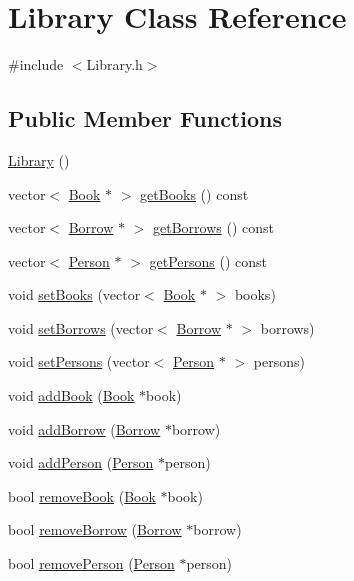 \hypertarget{class_library}{\section{Library Class Reference}
\label{class_library}
}


{\ttfamily \#include $<$Library.\+h$>$}

\subsection*{Public Member Functions}
\begin{DoxyCompactItemize}
\item 
\hyperlink{class_library_a82338219d8bf51962ff5f60a0db21b19}{Library} ()
\item 
vector$<$ \hyperlink{class_book}{Book} $\ast$ $>$ \hyperlink{class_library_a5c68dd0db0e426e601d56026dcab0c3a}{get\+Books} () const 
\item 
vector$<$ \hyperlink{class_borrow}{Borrow} $\ast$ $>$ \hyperlink{class_library_a426200a81b0a586d77d06f950d9f90c5}{get\+Borrows} () const 
\item 
vector$<$ \hyperlink{class_person}{Person} $\ast$ $>$ \hyperlink{class_library_afc03e416a30d319118794634f4be2e53}{get\+Persons} () const 
\item 
void \hyperlink{class_library_a4e0ca35d3bdeff3f8d173b4e721d37a8}{set\+Books} (vector$<$ \hyperlink{class_book}{Book} $\ast$ $>$ books)
\item 
void \hyperlink{class_library_a536f7dbc786266c5b14697fbc9b5adab}{set\+Borrows} (vector$<$ \hyperlink{class_borrow}{Borrow} $\ast$ $>$ borrows)
\item 
void \hyperlink{class_library_ab75b95897c1ec446b3b6782483898ef6}{set\+Persons} (vector$<$ \hyperlink{class_person}{Person} $\ast$ $>$ persons)
\item 
void \hyperlink{class_library_a2996f2fc786be395cb28497e8e0cb0db}{add\+Book} (\hyperlink{class_book}{Book} $\ast$book)
\item 
void \hyperlink{class_library_ae2dd97e7dad7e38c525ff682a216e68d}{add\+Borrow} (\hyperlink{class_borrow}{Borrow} $\ast$borrow)
\item 
void \hyperlink{class_library_ad914371ad542ffdf29a10f79a76fda59}{add\+Person} (\hyperlink{class_person}{Person} $\ast$person)
\item 
bool \hyperlink{class_library_a08fabb07a9d488eaa3e54367a0017964}{remove\+Book} (\hyperlink{class_book}{Book} $\ast$book)
\item 
bool \hyperlink{class_library_a6ac8ef36ea84e447e8a1c9a6531f37eb}{remove\+Borrow} (\hyperlink{class_borrow}{Borrow} $\ast$borrow)
\item 
bool \hyperlink{class_library_a4b581c83a98efda1f81e95060bb74bea}{remove\+Person} (\hyperlink{class_person}{Person} $\ast$person)
\end{DoxyCompactItemize}
